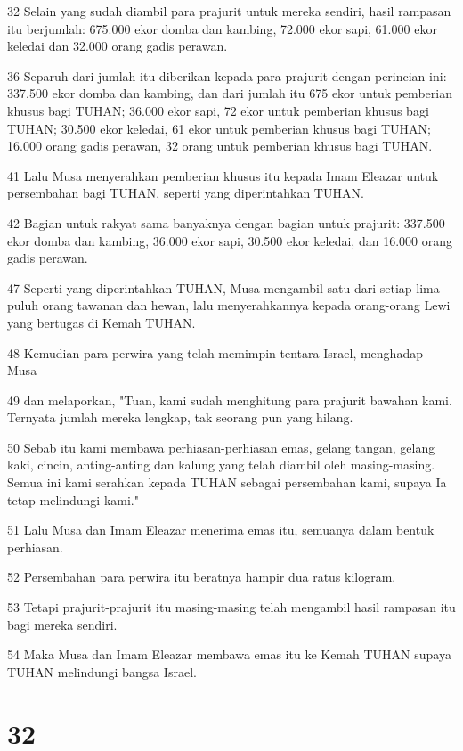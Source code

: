 \par 32 Selain yang sudah diambil para prajurit untuk mereka sendiri, hasil rampasan itu berjumlah: 675.000 ekor domba dan kambing, 72.000 ekor sapi, 61.000 ekor keledai dan 32.000 orang gadis perawan.
\par 36 Separuh dari jumlah itu diberikan kepada para prajurit dengan perincian ini: 337.500 ekor domba dan kambing, dan dari jumlah itu 675 ekor untuk pemberian khusus bagi TUHAN; 36.000 ekor sapi, 72 ekor untuk pemberian khusus bagi TUHAN; 30.500 ekor keledai, 61 ekor untuk pemberian khusus bagi TUHAN; 16.000 orang gadis perawan, 32 orang untuk pemberian khusus bagi TUHAN.
\par 41 Lalu Musa menyerahkan pemberian khusus itu kepada Imam Eleazar untuk persembahan bagi TUHAN, seperti yang diperintahkan TUHAN.
\par 42 Bagian untuk rakyat sama banyaknya dengan bagian untuk prajurit: 337.500 ekor domba dan kambing, 36.000 ekor sapi, 30.500 ekor keledai, dan 16.000 orang gadis perawan.
\par 47 Seperti yang diperintahkan TUHAN, Musa mengambil satu dari setiap lima puluh orang tawanan dan hewan, lalu menyerahkannya kepada orang-orang Lewi yang bertugas di Kemah TUHAN.
\par 48 Kemudian para perwira yang telah memimpin tentara Israel, menghadap Musa
\par 49 dan melaporkan, "Tuan, kami sudah menghitung para prajurit bawahan kami. Ternyata jumlah mereka lengkap, tak seorang pun yang hilang.
\par 50 Sebab itu kami membawa perhiasan-perhiasan emas, gelang tangan, gelang kaki, cincin, anting-anting dan kalung yang telah diambil oleh masing-masing. Semua ini kami serahkan kepada TUHAN sebagai persembahan kami, supaya Ia tetap melindungi kami."
\par 51 Lalu Musa dan Imam Eleazar menerima emas itu, semuanya dalam bentuk perhiasan.
\par 52 Persembahan para perwira itu beratnya hampir dua ratus kilogram.
\par 53 Tetapi prajurit-prajurit itu masing-masing telah mengambil hasil rampasan itu bagi mereka sendiri.
\par 54 Maka Musa dan Imam Eleazar membawa emas itu ke Kemah TUHAN supaya TUHAN melindungi bangsa Israel.

\chapter{32}

